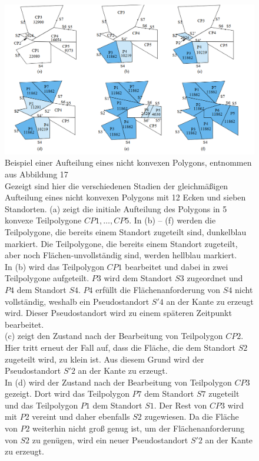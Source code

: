 \documentclass[ngerman]{seminarbeitrag}
\begin{document}
\begin{figure}[h]
\begin{center}
\includegraphics[width=1\textwidth]{./Abbildungen/5.png}   
\end{center}
\caption{\small Beispiel einer Aufteilung eines nicht konvexen Polygons, entnommen aus \cite{Hert.1998} Abbildung 17\\
Gezeigt sind hier die verschiedenen Stadien der gleichmäßigen Aufteilung eines nicht konvexen Polygons mit 12 Ecken und sieben Standorten. (a) zeigt die initiale Aufteilung des Polygons in 5 konvexe Teilpolygone $CP1, …,CP5$. In (b) – (f) werden die Teilpolygone, die bereits einem Standort zugeteilt sind, dunkelblau markiert. Die Teilpolygone, die bereits einem Standort zugeteilt, aber noch Flächen-unvollständig sind, werden hellblau markiert.\\
In (b) wird das Teilpolygon $CP1$ bearbeitet und dabei in zwei Teilpolygone aufgeteilt. $P3$ wird dem Standort $S3$ zugeordnet und $P4$ dem Standort $S4$. $P4$ erfüllt die Flächenanforderung von $S4$ nicht vollständig, weshalb ein Pseudostandort $S'4$ an der Kante zu erzeugt wird. Dieser Pseudostandort wird zu einem späteren Zeitpunkt bearbeitet.\\
 (c) zeigt den Zustand nach der Bearbeitung von Teilpolygon $CP2$. Hier tritt erneut der Fall auf, dass die Fläche, die dem Standort $S2$ zugeteilt wird, zu klein ist. Aus diesem Grund wird der Pseudostandort $S'2$ an der Kante zu erzeugt.\\
In (d) wird der Zustand nach der Bearbeitung von Teilpolygon $CP3$ gezeigt. Dort wird das Teilpolygon $P7$ dem Standort $S7$ zugeteilt und das Teilpolygon $P1$ dem Standort $S1$. Der Rest von $CP3$ wird mit $P2$ vereint und daher ebenfalls $S2$ zugewiesen. Da die Fläche von $P2$ weiterhin nicht groß genug ist, um der Flächenanforderung von $S2$ zu genügen, wird ein neuer Pseudostandort $S'2$ an der Kante zu erzeugt.\\
}
\end{figure}
\end{document}
